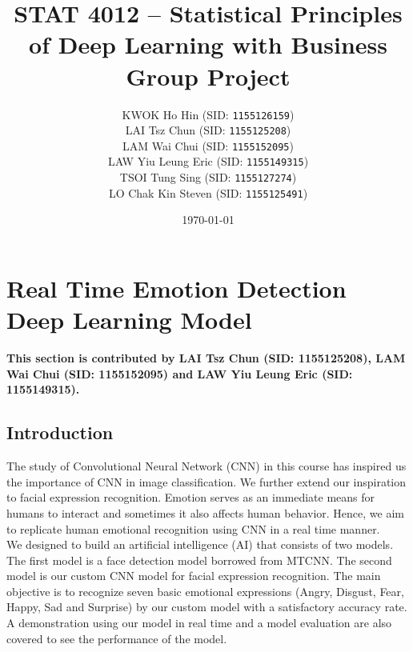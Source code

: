 \documentclass[11pt,a4paper]{article}
\begin{document}
    
    \thispagestyle{empty}
    \title{\textsc{STAT 4012} -- Statistical Principles of Deep Learning with Business \\ Group Project}
    \author{
        KWOK Ho Hin (SID: \texttt{1155126159}) \\
        LAI Tsz Chun (SID: \texttt{1155125208}) \\
        LAM Wai Chui (SID: \texttt{1155152095}) \\
        LAW Yiu Leung Eric (SID: \texttt{1155149315}) \\
        TSOI Tung Sing (SID: \texttt{1155127274}) \\
        LO Chak Kin Steven (SID: \texttt{1155125491})
    }
    \date{\today}
    \maketitle
    
    \tableofcontents
    \thispagestyle{empty}
    \newpage
    
    \setcounter{page}{1}
    
    \section{Real Time Emotion Detection Deep Learning Model}
    \textbf{This section is contributed by LAI Tsz Chun (SID: 1155125208), LAM Wai Chui (SID: 1155152095) and LAW Yiu Leung Eric (SID: 1155149315).}
    
    \subsection{Introduction}
    The study of Convolutional Neural Network (CNN) in this course has inspired us the importance of CNN in image classification. We further extend our inspiration to facial expression recognition. Emotion serves as an immediate means for humans to interact and sometimes it also affects human behavior. Hence, we aim to replicate human emotional recognition using CNN in a real time manner. \\
    We designed to build an artificial intelligence (AI) that consists of two models. The first model is a face detection model borrowed from MTCNN. The second model is our custom CNN model for facial expression recognition. The main objective is to recognize seven basic emotional expressions (Angry, Disgust, Fear, Happy, Sad and Surprise) by our custom model with a satisfactory accuracy rate. A demonstration using our model in real time and a model evaluation are also covered to see the performance of the model.
\end{document}
